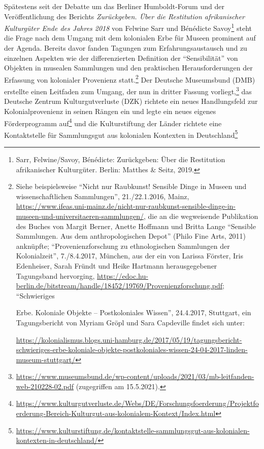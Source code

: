 \documentclass[a4paper,
fontsize=11pt,
oneside,
numbers=noperiodatend,
parskip=half-,
bibliography=totoc,
final
]{scrartcl}
\begin{document}
Spätestens seit der Debatte um das Berliner Humboldt-Forum und der
Veröffentlichung des Berichts \emph{Zurückgeben. Über die Restitution
afrikanischer Kulturgüter Ende des Jahres 2018} von Felwine Sarr und
Bénédicte Savoy\footnote{Sarr, Felwine/Savoy, Bénédicte: Zurückgeben:
  Über die Restitution afrikanischer Kulturgüter. Berlin: Matthes \&
  Seitz, 2019.} steht die Frage nach dem Umgang mit dem kolonialen Erbe
für Museen prominent auf der Agenda. Bereits davor fanden Tagungen zum
Erfahrungsaustausch und zu einzelnen Aspekten wie der differenzierten
Definition der \enquote{Sensibilität} von Objekten in musealen
Sammlungen und den praktischen Herausforderungen der Erfassung von
kolonialer Provenienz statt.\footnote{Siehe beispielsweise
  \enquote{Nicht nur Raubkunst! Sensible Dinge in Museen und
  wissenschaftlichen Sammlungen}, 21./22.1.2016, Mainz,
  \url{https://www.ifeas.uni-mainz.de/nicht-nur-raubkunst-sensible-dinge-in-museen-und-universitaeren-sammlungen/},
  die an die wegweisende Publikation des Buches von Margit Berner,
  Anette Hoffmann und Britta Lange \enquote{Sensible Sammlungen. Aus dem
  anthropologischen Depot} (Philo Fine Arts, 2011) anknüpfte;
  \enquote{Provenienzforschung zu ethnologischen Sammlungen der
  Kolonialzeit}, 7./8.4.2017, München, aus der ein von Larissa Förster,
  Iris Edenheiser, Sarah Fründt und Heike Hartmann herausgegebener
  Tagungsband hervorging,
  \url{https://edoc.hu-berlin.de/bitstream/handle/18452/19769/Provenienzforschung.pdf};
  ``Schwieriges

  Erbe. Koloniale Objekte -- Postkoloniales Wissen'', 24.4.2017,
  Stuttgart, ein Tagungsbericht von Myriam Gröpl und Sara Capdeville
  findet sich unter:

  \url{https://kolonialismus.blogs.uni-hamburg.de/2017/05/19/tagungsbericht-schwieriges-erbe-koloniale-objekte-postkoloniales-wissen-24-04-2017-linden-museum-stuttgart/}}
Der Deutsche Museumsbund (DMB) erstellte einen Leitfaden zum Umgang, der
nun in dritter Fassung vorliegt,\footnote{\url{https://www.museumsbund.de/wp-content/uploads/2021/03/mb-leitfanden-web-210228-02.pdf}
  (zugegriffen am 15.5.2021).} das Deutsche Zentrum Kulturgutverluste
(DZK) richtete ein neues Handlungsfeld zur Kolonialprovenienz in seinen
Rängen ein und legte ein neues eigenes Förderprogramm auf\footnote{\url{https://www.kulturgutverluste.de/Webs/DE/Forschungsfoerderung/Projektfoerderung-Bereich-Kulturgut-aus-kolonialem-Kontext/Index.html}}
und die Kulturstiftung der Länder richtete eine Kontaktstelle für
Sammlungsgut aus kolonialen Kontexten in Deutschland\footnote{\url{https://www.kulturstiftung.de/kontaktstelle-sammlungsgut-aus-kolonialen-kontexten-in-deutschland/}}
\end{document}
